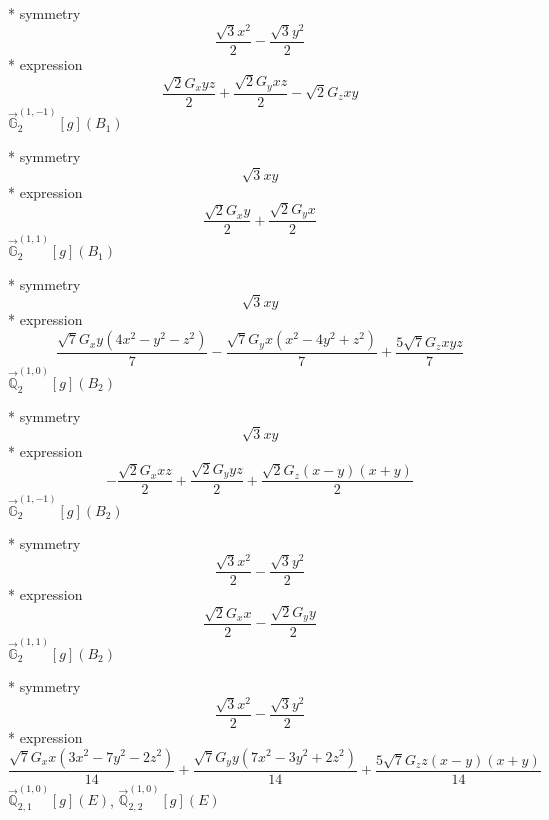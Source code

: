 \documentclass[fleqn,8pt]{jsarticle}
\begin{document}
\noindent\quad ** symmetry
\begin{dmath*}
\frac{\sqrt{3} x^{2}}{2} - \frac{\sqrt{3} y^{2}}{2}
\end{dmath*}
\noindent\quad ** expression
\begin{dmath*}
\frac{\sqrt{2} G_{x} y z}{2} + \frac{\sqrt{2} G_{y} x z}{2} - \sqrt{2} G_{z} x y
\end{dmath*}
\noindent\quad $\vec{\mathbb{G}}_{2}^{(1,-1)}[g](B_{1})$

\noindent\quad ** symmetry
\begin{dmath*}
\sqrt{3} x y
\end{dmath*}
\noindent\quad ** expression
\begin{dmath*}
\frac{\sqrt{2} G_{x} y}{2} + \frac{\sqrt{2} G_{y} x}{2}
\end{dmath*}
\noindent\quad $\vec{\mathbb{G}}_{2}^{(1,1)}[g](B_{1})$

\noindent\quad ** symmetry
\begin{dmath*}
\sqrt{3} x y
\end{dmath*}
\noindent\quad ** expression
\begin{dmath*}
\frac{\sqrt{7} G_{x} y \left(4 x^{2} - y^{2} - z^{2}\right)}{7} - \frac{\sqrt{7} G_{y} x \left(x^{2} - 4 y^{2} + z^{2}\right)}{7} + \frac{5 \sqrt{7} G_{z} x y z}{7}
\end{dmath*}
\noindent\quad $\vec{\mathbb{Q}}_{2}^{(1,0)}[g](B_{2})$

\noindent\quad ** symmetry
\begin{dmath*}
\sqrt{3} x y
\end{dmath*}
\noindent\quad ** expression
\begin{dmath*}
- \frac{\sqrt{2} G_{x} x z}{2} + \frac{\sqrt{2} G_{y} y z}{2} + \frac{\sqrt{2} G_{z} \left(x - y\right) \left(x + y\right)}{2}
\end{dmath*}
\noindent\quad $\vec{\mathbb{G}}_{2}^{(1,-1)}[g](B_{2})$

\noindent\quad ** symmetry
\begin{dmath*}
\frac{\sqrt{3} x^{2}}{2} - \frac{\sqrt{3} y^{2}}{2}
\end{dmath*}
\noindent\quad ** expression
\begin{dmath*}
\frac{\sqrt{2} G_{x} x}{2} - \frac{\sqrt{2} G_{y} y}{2}
\end{dmath*}
\noindent\quad $\vec{\mathbb{G}}_{2}^{(1,1)}[g](B_{2})$

\noindent\quad ** symmetry
\begin{dmath*}
\frac{\sqrt{3} x^{2}}{2} - \frac{\sqrt{3} y^{2}}{2}
\end{dmath*}
\noindent\quad ** expression
\begin{dmath*}
\frac{\sqrt{7} G_{x} x \left(3 x^{2} - 7 y^{2} - 2 z^{2}\right)}{14} + \frac{\sqrt{7} G_{y} y \left(7 x^{2} - 3 y^{2} + 2 z^{2}\right)}{14} + \frac{5 \sqrt{7} G_{z} z \left(x - y\right) \left(x + y\right)}{14}
\end{dmath*}
\noindent\quad $\vec{\mathbb{Q}}_{2,1}^{(1,0)}[g](E)$, $\vec{\mathbb{Q}}_{2,2}^{(1,0)}[g](E)$
\end{document}
